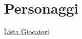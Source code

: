 \section{Personaggi}\label{personaggi}

\href{Lista\%20Giocatori\%206085ac837c224fe6a7baa3df6bb680e7.csv}{Lista
Giocatori}
